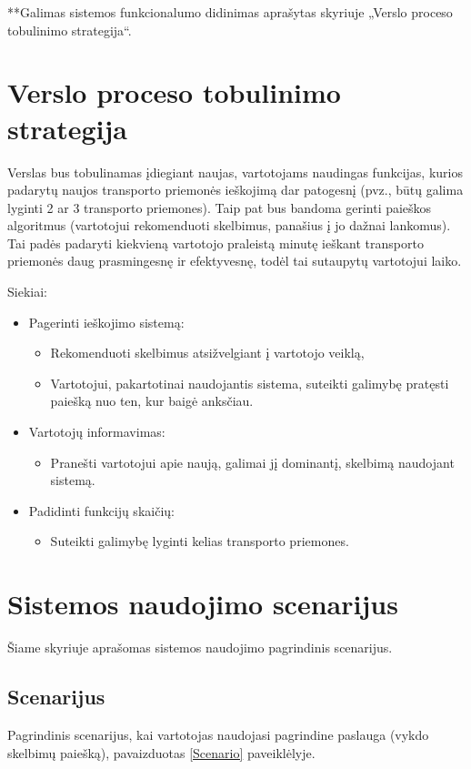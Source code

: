 \documentclass[12pt]{article}
\begin{document}
	**Galimas sistemos funkcionalumo didinimas aprašytas skyriuje „Verslo proceso tobulinimo strategija“.
	\pagebreak
	
	\section{Verslo proceso tobulinimo strategija}
	
	Verslas bus tobulinamas įdiegiant naujas, vartotojams naudingas funkcijas, kurios padarytų naujos transporto priemonės ieškojimą dar patogesnį (pvz., būtų galima lyginti 2 ar 3 transporto priemones). Taip pat bus bandoma gerinti paieškos algoritmus (vartotojui rekomenduoti skelbimus, panašius į jo dažnai lankomus). Tai padės padaryti kiekvieną vartotojo praleistą minutę ieškant transporto priemonės daug prasmingesnę ir efektyvesnę, todėl tai sutaupytų vartotojui laiko.
	\bigskip	
	
	Siekiai:
	\begin{itemize}
		\item{Pagerinti ieškojimo sistemą:}
		\begin{itemize}
			\item{Rekomenduoti skelbimus atsižvelgiant į vartotojo veiklą,}
			\item{Vartotojui, pakartotinai naudojantis sistema, suteikti galimybę pratęsti paiešką nuo ten, kur baigė anksčiau.}
		\end{itemize}
		\item{Vartotojų informavimas:}
		\begin{itemize}
			\item{Pranešti vartotojui apie naują, galimai jį dominantį, skelbimą naudojant sistemą.}
		\end{itemize}
		\item{Padidinti funkcijų skaičių:}
		\begin{itemize}
			\item{Suteikti galimybę lyginti kelias transporto priemones.}
		\end{itemize}
	\end{itemize}
	\pagebreak
	
	\section{Sistemos naudojimo scenarijus}
	Šiame skyriuje aprašomas sistemos naudojimo pagrindinis scenarijus.
	
	\subsection{Scenarijus}
	Pagrindinis scenarijus, kai vartotojas naudojasi pagrindine paslauga (vykdo skelbimų paiešką), pavaizduotas \ref{Scenario} paveiklėlyje.
	
\end{document}
